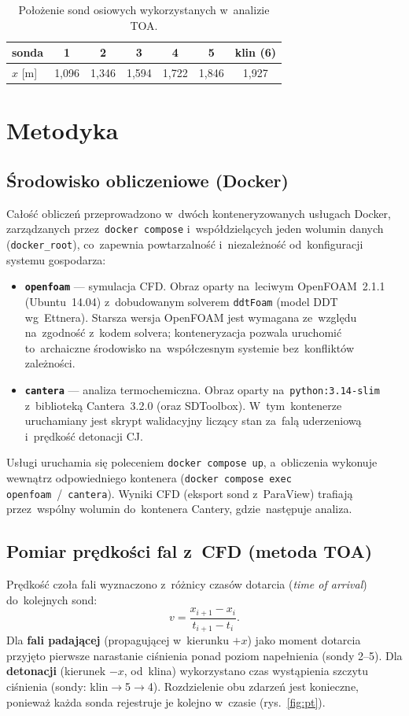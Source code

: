 \documentclass[11pt,a4paper]{article}
\begin{document}
\begin{table}[h]
\centering
\caption{Położenie sond osiowych wykorzystanych w~analizie TOA.}
\label{tab:probes}
\begin{tabular}{lcccccc}
\toprule
sonda & 1 & 2 & 3 & 4 & 5 & klin (6) \\
\midrule
$x$ [\si{\meter}] & 1,096 & 1,346 & 1,594 & 1,722 & 1,846 & 1,927 \\
\bottomrule
\end{tabular}
\end{table}

\section{Metodyka}

\subsection{Środowisko obliczeniowe (Docker)}
Całość obliczeń przeprowadzono w~dwóch konteneryzowanych usługach Docker,
zarządzanych przez~\texttt{docker compose} i~współdzielących jeden wolumin
danych (\texttt{docker\_root}), co~zapewnia powtarzalność i~niezależność
od~konfiguracji systemu gospodarza:
\begin{itemize}
\item \textbf{\texttt{openfoam}} --- symulacja CFD. Obraz oparty na~leciwym
OpenFOAM~2.1.1 (Ubuntu~14.04) z~dobudowanym solverem \texttt{ddtFoam}
(model DDT wg~Ettnera). Starsza wersja OpenFOAM jest wymagana ze~względu
na~zgodność z~kodem solvera; konteneryzacja pozwala uruchomić to~archaiczne
środowisko na~współczesnym systemie bez~konfliktów zależności.
\item \textbf{\texttt{cantera}} --- analiza termochemiczna. Obraz oparty
na~\texttt{python:3.14-slim} z~biblioteką Cantera~3.2.0 (oraz SDToolbox).
W~tym~kontenerze uruchamiany jest skrypt walidacyjny liczący stan
za~falą uderzeniową i~prędkość detonacji CJ.
\end{itemize}
Usługi uruchamia się poleceniem \texttt{docker compose up}, a~obliczenia
wykonuje wewnątrz odpowiedniego kontenera
(\texttt{docker compose exec openfoam}~/~\texttt{cantera}). Wyniki CFD
(eksport sond z~ParaView) trafiają przez~wspólny wolumin do~kontenera
Cantery, gdzie~następuje analiza.

\subsection{Pomiar prędkości fal z~CFD (metoda TOA)}
Prędkość czoła fali wyznaczono z~różnicy czasów dotarcia (\emph{time of arrival})
do~kolejnych sond:
\begin{equation}
v=\frac{x_{i+1}-x_i}{t_{i+1}-t_i}.
\end{equation}
Dla \textbf{fali padającej} (propagującej w~kierunku $+x$) jako moment dotarcia
przyjęto pierwsze narastanie ciśnienia ponad poziom napełnienia
(sondy 2--5). Dla \textbf{detonacji} (kierunek $-x$, od~klina) wykorzystano
czas wystąpienia szczytu ciśnienia (sondy: klin$\to$5$\to$4). Rozdzielenie
obu zdarzeń jest konieczne, ponieważ każda sonda rejestruje je kolejno
w~czasie (rys.~\ref{fig:pt}).
\end{document}
